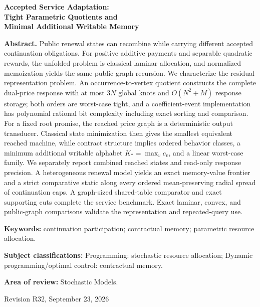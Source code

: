\documentclass[11pt,letterpaper]{article}
\theoremstyle{definition}\newtheorem{assumption}[theorem]{Assumption}
\begin{document}
\hypersetup{pageanchor=false}
\begin{titlepage}\centering
{\Large\bfseries Accepted Service Adaptation:\\ Tight Parametric Quotients and\\ Minimal Additional Writable Memory\par}
\vspace{.35in}{Anonymous manuscript for Operations Research\par}\vspace{.25in}
\begin{minipage}{\textwidth}
\textbf{Abstract.} Public renewal states can recombine while carrying different accepted continuation obligations. For positive additive payments and separable quadratic rewards, the unfolded problem is classical laminar allocation, and normalized memoization yields the same public-graph recursion. We characterize the residual representation problem. An occurrence-to-vertex quotient constructs the complete dual-price response with at most $3N$ global knots and $O(N^2+M)$ response storage; both orders are worst-case tight, and a coefficient-event implementation has polynomial rational bit complexity including exact sorting and comparison. For a fixed root promise, the reached price graph is a deterministic output transducer. Classical state minimization then gives the smallest equivalent reached machine, while contract structure implies ordered behavior classes, a minimum additional writable alphabet $K_*=\max_v c_v$, and a linear worst-case family. We separately report combined reached states and read-only response precision. A heterogeneous renewal model yields an exact memory-value frontier and a strict comparative static along every ordered mean-preserving radial spread of continuation caps. A graph-sized shared-table comparator and exact supporting cuts complete the service benchmark. Exact laminar, convex, and public-graph comparisons validate the representation and repeated-query use.
\par\vspace{.15in}\textbf{Keywords:} continuation participation; contractual memory; parametric resource allocation.
\par\vspace{.1in}\textbf{Subject classifications:} Programming: stochastic resource allocation; Dynamic programming/optimal control: contractual memory.
\par\vspace{.1in}\textbf{Area of review:} Stochastic Models.
\end{minipage}\vfill{Revision R32, September 23, 2026\par}
\end{titlepage}
\end{document}
